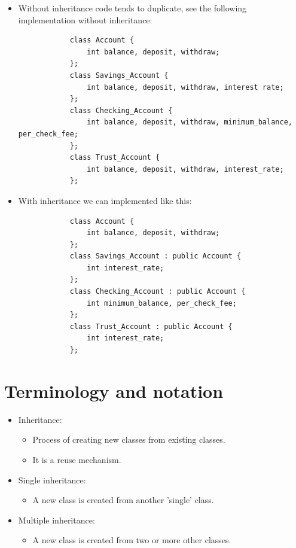 \begin{itemize}
    \item Without inheritance code tends to duplicate, see the following implementation without inheritance:
        \begin{verbatim}
            class Account {
                int balance, deposit, withdraw;
            };
            class Savings_Account {
                int balance, deposit, withdraw, interest rate;
            };
            class Checking_Account {
                int balance, deposit, withdraw, minimum_balance, per_check_fee;
            };
            class Trust_Account {
                int balance, deposit, withdraw, interest_rate;
            };
        \end{verbatim}
    
    
    \item With inheritance we can implemented like this:
        \begin{verbatim}
            class Account {
                int balance, deposit, withdraw;
            };
            class Savings_Account : public Account {
                int interest_rate;
            };
            class Checking_Account : public Account {
                int minimum_balance, per_check_fee;
            };
            class Trust_Account : public Account {
                int interest_rate;
            };
        \end{verbatim}
\end{itemize}

\section{Terminology and notation}
\begin{itemize}
    \item Inheritance:
        \begin{itemize}
            \item Process of creating new classes from existing classes.
            \item It is a reuse mechanism.
        \end{itemize}
    
    \item Single inheritance:
        \begin{itemize}
            \item A new class is created from another 'single' class.
        \end{itemize}
    
    \item Multiple inheritance:
        \begin{itemize}
            \item A new class is created from two or more other classes.
        \end{itemize}
\end{itemize}

